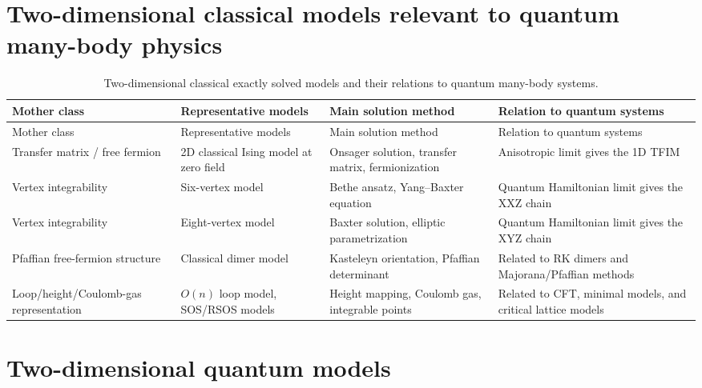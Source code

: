 \documentclass[12pt,openany]{book}
\theoremstyle{definition}
\theoremstyle{plain}
\begin{document}
\section{Two-dimensional classical models relevant to quantum many-body physics}

{\footnotesize\setlength{\tabcolsep}{3pt}\begin{longtable}{L{0.20\textwidth}L{0.23\textwidth}L{0.24\textwidth}L{0.18\textwidth}}
\caption{Two-dimensional classical exactly solved models and their relations to quantum many-body systems.}\label{tab:2d-classical-taxonomy}\\
\toprule
Mother class & Representative models & Main solution method & Relation to quantum systems \\
\midrule
\endfirsthead
\toprule
Mother class & Representative models & Main solution method & Relation to quantum systems \\
\midrule
\endhead
Transfer matrix / free fermion & 2D classical Ising model at zero field & Onsager solution, transfer matrix, fermionization & Anisotropic limit gives the 1D TFIM \\
Vertex integrability & Six-vertex model & Bethe ansatz, Yang--Baxter equation & Quantum Hamiltonian limit gives the XXZ chain \\
Vertex integrability & Eight-vertex model & Baxter solution, elliptic parametrization & Quantum Hamiltonian limit gives the XYZ chain \\
Pfaffian free-fermion structure & Classical dimer model & Kasteleyn orientation, Pfaffian determinant & Related to RK dimers and Majorana/Pfaffian methods \\
Loop/height/\newline Coulomb-gas representation & $O(n)$ loop model, SOS/RSOS models & Height mapping, Coulomb gas, integrable points & Related to CFT, minimal models, and critical lattice models \\
\bottomrule
\end{longtable}}

\section{Two-dimensional quantum models}
\end{document}
